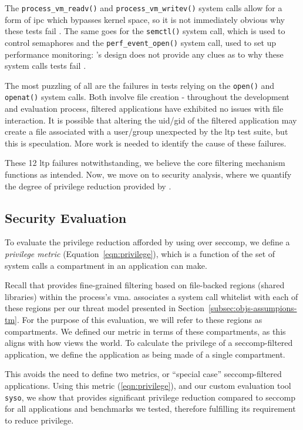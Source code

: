 The \texttt{process\_vm\_readv()} and \texttt{process\_vm\_writev()} system calls 
allow for a form of \ac{ipc} which bypasses kernel space, so it is not immediately 
obvious why these tests fail \cite{process_vm_readv}. The same goes for the 
\texttt{semctl()} system call, which is used to control semaphores and the 
\texttt{perf\_event\_open()} system call, used to set up performance
monitoring: \af's design does not provide any clues as to why these system
calls tests fail \cite{perf_event_open}.

The most puzzling of all are the failures in tests relying on the 
\texttt{open()} and \texttt{openat()} system calls. Both involve file creation -
throughout the development and evaluation process, filtered applications have
exhibited no issues with file interaction. It is possible that altering the
\ac{uid}/\ac{gid} of the filtered application may create a file associated with
a user/group unexpected by the \ac{ltp} test suite, but this is speculation.
More work is needed to identify the cause of these failures.

These 12 \ac{ltp} failures notwithstanding, we believe the core filtering
mechanism functions as intended. Now, we move on to security analysis,
where we quantify the degree of privilege reduction provided by \af.

\subsection{Security Evaluation}\label{subsec:security-eval}

To evaluate the privilege reduction afforded by using \af over seccomp, we
define a \textit{privilege metric} (Equation~\ref{eqn:privilege}), which is
a function of the set of system calls a compartment in an application can make.

Recall that \af provides fine-grained filtering based on file-backed
regions (shared libraries) within the process's \ac{vma}. \af associates a 
system call whitelist with each of these regions per our threat
model presented in Section~\ref{subsec:objs-assumpions-tm}. For the purpose of this
evaluation, we will refer to these regions as compartments. We defined our metric in terms of these compartments, as this aligns with how \af
views the world. To calculate the privilege of a seccomp-filtered application,
we define the application as being made of a single compartment. 

This avoids the need to define two metrics, or ``special case'' 
seccomp-filtered applications.  Using this metric (\ref{eqn:privilege}), and our custom evaluation
tool \texttt{syso}, we show that \af provides significant privilege
reduction compared to seccomp for all applications and benchmarks we tested,
therefore fulfilling its requirement to reduce privilege.
 
